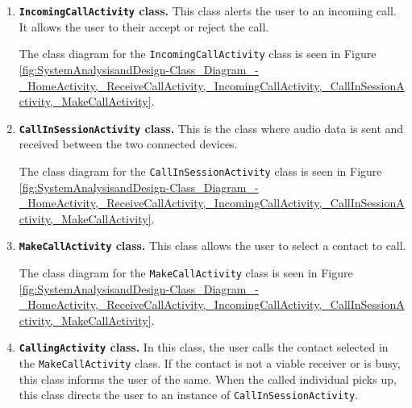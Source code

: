 \documentclass[12pt,svgnames,smaller]{article} %
\begin{document}
\begin{enumerate}
		\item \textbf{\texttt{IncomingCallActivity} class.} This class alerts the user to an incoming call. It allows the user to their accept or reject the call.
		
		The class diagram for the \texttt{IncomingCallActivity} class is seen in Figure \ref{fig:SystemAnalysisandDesign-Class_Diagram_-_HomeActivity,_ReceiveCallActivity,_IncomingCallActivity,_CallInSessionActivity,_MakeCallActivity}.
		
		\item \textbf{\texttt{CallInSessionActivity} class.} This is the class where audio data is sent and received between the two connected devices.
		
		The class diagram for the \texttt{CallInSessionActivity} class is seen in Figure \ref{fig:SystemAnalysisandDesign-Class_Diagram_-_HomeActivity,_ReceiveCallActivity,_IncomingCallActivity,_CallInSessionActivity,_MakeCallActivity}.
		
		\item \textbf{\texttt{MakeCallActivity} class.} This class allows the user to select a contact to call.
		
		The class diagram for the \texttt{MakeCallActivity} class is seen in Figure \ref{fig:SystemAnalysisandDesign-Class_Diagram_-_HomeActivity,_ReceiveCallActivity,_IncomingCallActivity,_CallInSessionActivity,_MakeCallActivity}.
		
		\item \textbf{\texttt{CallingActivity} class.} In this class, the user calls the contact selected in the \texttt{MakeCallActivity} class. If the contact is not a viable receiver or is busy, this class informs the user of the same. When the called individual picks up, this class directs the user to an instance of \texttt{CallInSessionActivity}.
		

\end{enumerate}
\end{document}
